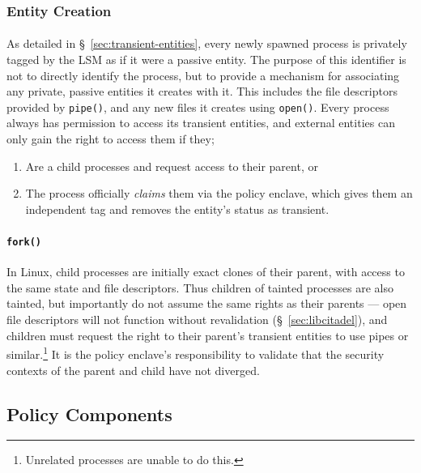 \subsubsection{Entity Creation}
\label{sec:entity-creation}
\paragraph{} As detailed in §~\ref{sec:transient-entities}, every newly spawned process is privately tagged by the LSM as if it were a passive entity. The purpose of this identifier is not to directly identify the process, but to provide a mechanism for associating any private, passive entities it creates with it. This includes the file descriptors provided by \texttt{pipe()}, and any new files it creates using \texttt{open()}. Every process always has permission to access its transient entities, and external entities can only gain the right to access them if they;
\begin{enumerate}
    \item Are a child processes and request access to their parent, or
    \item The process officially \textit{claims} them via the policy enclave, which gives them an independent tag and removes the entity's status as transient. 
\end{enumerate}


\paragraph{\texttt{fork()}} In Linux, child processes are initially exact clones of their parent, with access to the same state and file descriptors. Thus children of tainted processes are also tainted, but importantly do not assume the same rights as their parents --- open file descriptors will not function without revalidation (§~\ref{sec:libcitadel}), and children must request the right to their parent's transient entities to use pipes or similar.\footnote{Unrelated processes are unable to do this.} It is the policy enclave's responsibility to validate that the security contexts of the parent and child have not diverged. 





\subsection{Policy Components}
\label{sec:policy-enclave}

